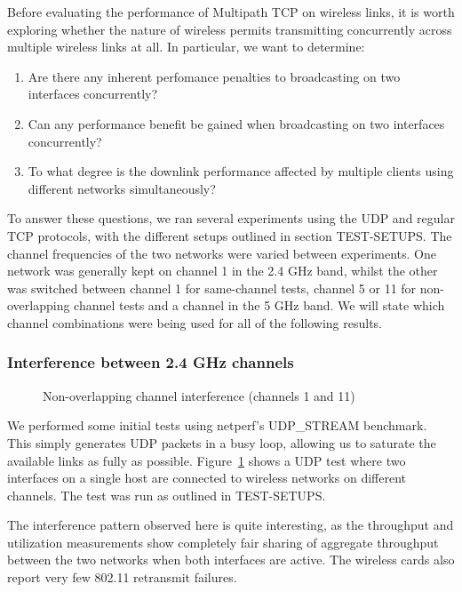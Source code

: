 Before evaluating the performance of Multipath TCP on wireless links, it is worth exploring whether the nature of wireless permits transmitting concurrently across multiple wireless links at all. In particular, we want to determine:

\begin{enumerate}
  \item Are there any inherent perfomance penalties to broadcasting on two interfaces concurrently?
  \item Can any performance benefit be gained when broadcasting on two interfaces concurrently?
  \item To what degree is the downlink performance affected by multiple clients using different networks simultaneously?
\end{enumerate}

To answer these questions, we ran several experiments using the UDP and regular TCP protocols, with the different
setups outlined in section TEST-SETUPS. %
The channel frequencies of the two networks were varied between experiments. One network was generally kept on channel 1 in the 2.4 GHz band,
whilst the other was switched between channel 1 for same-channel tests, channel
5 or 11 for non-overlapping channel tests and a channel in the 5 GHz band. We will state
which channel combinations were being used for all of the following results.

\subsubsection{Interference between 2.4 GHz channels}

\begin{figure}[h]
 \centering
 
 \caption{Non-overlapping channel interference (channels 1 and 11)}\label{graph:cc-interference}
\end{figure}

We performed some initial tests using netperf's UDP_STREAM benchmark. This simply generates UDP packets in a busy loop, allowing us to saturate the available links as fully as possible. Figure~\ref{graph:cc-interference} shows a UDP
test where two interfaces on a single host are connected to wireless networks
on different channels. The test was run as outlined in TEST-SETUPS.            %

The interference pattern observed here is quite
interesting, as the throughput and utilization measurements show completely
fair sharing of aggregate throughput between the two networks when both interfaces are active. The wireless cards
also report very few 802.11 retransmit failures.

